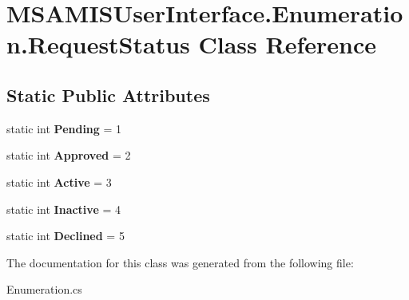 \hypertarget{class_m_s_a_m_i_s_user_interface_1_1_enumeration_1_1_request_status}{}\section{M\+S\+A\+M\+I\+S\+User\+Interface.\+Enumeration.\+Request\+Status Class Reference}
\label{class_m_s_a_m_i_s_user_interface_1_1_enumeration_1_1_request_status}
\subsection*{Static Public Attributes}
\begin{DoxyCompactItemize}
\item 
\mbox{\label{class_m_s_a_m_i_s_user_interface_1_1_enumeration_1_1_request_status_a7d1a99a8523f2fff499ccbb505949c36}} 
static int {\bfseries Pending} = 1
\item 
\mbox{\label{class_m_s_a_m_i_s_user_interface_1_1_enumeration_1_1_request_status_abe22e90a7f01138b0e3a63e095a081c4}} 
static int {\bfseries Approved} = 2
\item 
\mbox{\label{class_m_s_a_m_i_s_user_interface_1_1_enumeration_1_1_request_status_a706155a65d3df462619b65e15c529990}} 
static int {\bfseries Active} = 3
\item 
\mbox{\label{class_m_s_a_m_i_s_user_interface_1_1_enumeration_1_1_request_status_a84a38551e2b6664d4a29484d9d6b645d}} 
static int {\bfseries Inactive} = 4
\item 
\mbox{\label{class_m_s_a_m_i_s_user_interface_1_1_enumeration_1_1_request_status_a2897a63468433c22427f1d49c4441185}} 
static int {\bfseries Declined} = 5
\end{DoxyCompactItemize}


The documentation for this class was generated from the following file\+:\begin{DoxyCompactItemize}
\item 
Enumeration.\+cs\end{DoxyCompactItemize}
